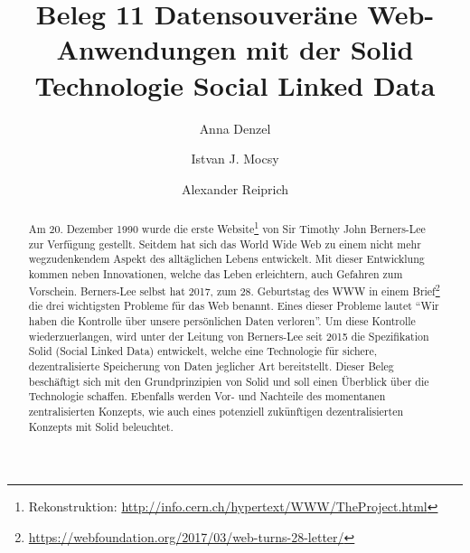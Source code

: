 \documentclass[acmtog]{acmart}
\begin{document}
\title{Beleg 11 Datensouveräne Web-Anwendungen mit der Solid Technologie Social Linked Data}

\author{Anna Denzel}
\authornotemark[1]
\author{Istvan J. Mocsy}
\authornotemark[1]
\author{Alexander Reiprich}
\authornotemark[1]
\begin{abstract}
Am 20. Dezember 1990 wurde die erste Website\footnote{Rekonstruktion: \url{http://info.cern.ch/hypertext/WWW/TheProject.html}} von Sir Timothy John Berners-Lee zur Verfügung gestellt. Seitdem hat sich das World Wide Web zu einem nicht mehr wegzudenkendem Aspekt des alltäglichen Lebens entwickelt. Mit dieser Entwicklung kommen neben Innovationen, welche das Leben erleichtern, auch Gefahren zum Vorschein. Berners-Lee selbst hat 2017, zum 28. Geburtstag  des WWW in einem Brief\footnote{\url{https://webfoundation.org/2017/03/web-turns-28-letter/}} die drei wichtigsten Probleme für das Web benannt. Eines dieser Probleme lautet "`Wir haben die Kontrolle über unsere persönlichen Daten verloren"'. Um diese Kontrolle wiederzuerlangen, wird unter der Leitung von Berners-Lee seit 2015 die Spezifikation Solid (Social Linked Data) entwickelt, welche eine Technologie für sichere, dezentralisierte Speicherung von Daten jeglicher Art bereitstellt. Dieser Beleg beschäftigt sich mit den Grundprinzipien von Solid und soll einen Überblick über die Technologie schaffen. Ebenfalls werden Vor- und Nachteile des momentanen zentralisierten Konzepts, wie auch eines potenziell zukünftigen dezentralisierten Konzepts mit Solid beleuchtet.
\end{abstract}

\maketitle
\end{document}
